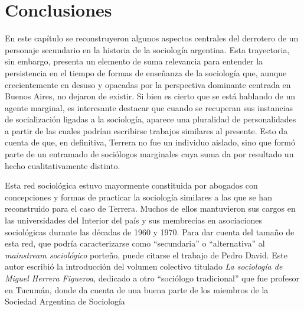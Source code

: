 \section{Conclusiones}

En este capítulo se reconstruyeron algunos aspectos centrales del derrotero de un personaje secundario en la historia de la sociología argentina. Esta trayectoria, sin embargo, presenta un elemento de suma relevancia para entender la persistencia en el tiempo de formas de enseñanza de la sociología que, aunque crecientemente en desuso y opacadas por la perspectiva dominante centrada en Buenos Aires, no dejaron de existir. Si bien es cierto que se está hablando de un agente marginal, es interesante destacar que cuando se recuperan sus instancias de socialización ligadas a la sociología, aparece una pluralidad de personalidades a partir de las cuales podrían escribirse trabajos similares al presente. Esto da cuenta de que, en definitiva, Terrera no fue un individuo aislado, sino que formó parte de un entramado de sociólogos marginales cuya suma da por resultado un hecho cualitativamente distinto.

Esta red sociológica estuvo mayormente constituida por abogados con concepciones y formas de practicar la sociología similares a las que se han reconstruido para el caso de Terrera. Muchos de ellos mantuvieron sus cargos en las universidades del Interior del país y sus membrecías en asociaciones sociológicas durante las décadas de 1960 y 1970. Para dar cuenta del tamaño de esta red, que podría caracterizarse como \enquote{secundaria} o \enquote{alternativa} al \emph{mainstream sociológico} porteño, puede citarse el trabajo de Pedro David. Este autor escribió la introducción del volumen colectivo titulado \emph{La sociología de Miguel Herrera Figueroa}, dedicado a otro \enquote{sociólogo tradicional} que fue profesor en Tucumán, donde da cuenta de una buena parte de los miembros de la Sociedad Argentina de Sociología

